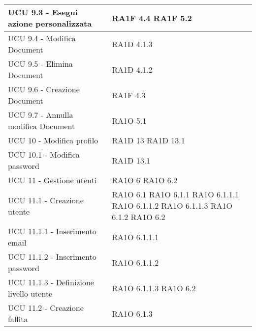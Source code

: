 \begin{center}
\begin{longtable}{ | p{5cm} | p{5cm} |}
            UCU 9.3 - Esegui azione personalizzata &  RA1F 4.4 \newline  RA1F 5.2 \newline  \\ \hline      
            UCU 9.4 - Modifica Document &  RA1D 4.1.3 \newline  \\ \hline      
            UCU 9.5 - Elimina Document &  RA1D 4.1.2 \newline  \\ \hline      
            UCU 9.6 - Creazione Document &  RA1F 4.3 \newline  \\ \hline      
            UCU 9.7 - Annulla modifica Document &  RA1O 5.1 \newline  \\ \hline      
            UCU 10 - Modifica profilo &  RA1D 13 \newline  RA1D 13.1 \newline  \\ \hline      
            UCU 10.1 - Modifica password &  RA1D 13.1 \newline  \\ \hline      
            UCU 11 - Gestione utenti &  RA1O 6 \newline  RA1O 6.2 \newline  \\ \hline      
            UCU 11.1 - Creazione utente &  RA1O 6.1 \newline  RA1O 6.1.1 \newline  RA1O 6.1.1.1 \newline  RA1O 6.1.1.2 \newline  RA1O 6.1.1.3 \newline  RA1O 6.1.2 \newline  RA1O 6.2 \newline  \\ \hline      
            UCU 11.1.1 - Inserimento email &  RA1O 6.1.1.1 \newline  \\ \hline      
            UCU 11.1.2 - Inserimento password &  RA1O 6.1.1.2 \newline  \\ \hline      
            UCU 11.1.3 - Definizione livello utente &  RA1O 6.1.1.3 \newline  RA1O 6.2 \newline  \\ \hline      
            UCU 11.2 - Creazione fallita &  RA1O 6.1.3 \newline  \\ \hline      

\end{longtable}
\end{center}
